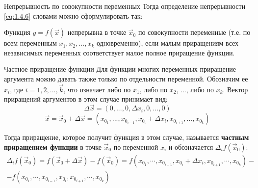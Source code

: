 \begin{tbox}{Непрерывность по совокупности переменных}
	Тогда определение непрерывности \cref{eq:1.4.6} словами можно сформулировать так:

	Функция $y = f(\vec{x})$ непрерывна в точке $\vec{x}_0$ по совокупности переменные (т.е. по всем  переменным $x_1, x_2, ..., x_k$ одновременно), если малым приращениям всех независимых переменных соответствует малое полное приращение функции.
\end{tbox}

\begin{tbox}{Частное приращение функции}
	Для функции многих переменных приращение аргумента можно давать также только по отдельности переменной. Обозначим ее $x_i$, где $i=1,2,..., \vec{k}$, что означает либо по $x_1$, либо по $x_2$, ..., либо по $x_k$. Вектор приращений аргументов в этом случае принимает вид:
	\[\Delta \vec{x} = (0, ..., 0, \Delta x_i, 0, ..., 0)\]
	\[\vec{x} = \vec{x}_0 + \Delta \vec{x} = (x_\text{$0_1$}, ..., x_\text{$0_{i - 1}$}, x_\text{$0_i$} + \Delta x_i, x_\text{$0_{i + 1}$}, ..., x_\text{$0_k$})\]

	Тогда приращение, которое получит функция в этом случае, называется \textbf{частным приращением функции} в точке $\vec{x}_0$ по переменной $x_i$ и обозначается $\Delta_i f(\vec{x}_0)$:
	\begin{multline} \label{eq:1.4.8}
		\Delta_i f(\vec{x}_0) = f(\vec{x}_0 + \Delta \vec{x}) - f(\vec{x}_0) = f(x_\text{$0_1$}, \cdots, x_\text{$0_{i - 1}$}, x_\text{$0_i$} + \Delta x_i, x_\text{$0_{i + 1}$}, \cdots, x_\text{$0_k$}) - \\
		-f(x_\text{$0_1$}, \cdots, x_\text{$0_{i-1}$}, x_\text{$0_i$}, x_\text{$0_{i+1}$}, \cdots, x_\text{$0_k$})
	\end{multline}
\end{tbox}

